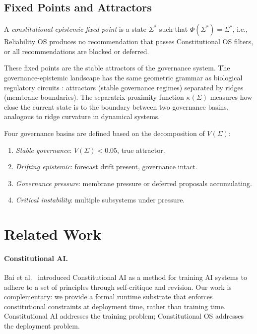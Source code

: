 \documentclass[11pt]{article}
\begin{document}
\subsection{Fixed Points and Attractors}

A \emph{constitutional-epistemic fixed point} is a state
$\Sigma^*$ such that $\Phi(\Sigma^*) = \Sigma^*$, i.e.,
Reliability OS produces no recommendation that passes
Constitutional OS filters, or all recommendations are blocked
or deferred.

These fixed points are the stable attractors of the governance
system. The governance-epistemic landscape has the same geometric
grammar as biological regulatory circuits
\citep{ferrell2002bistability}: attractors (stable governance
regimes) separated by ridges (membrane boundaries). The
separatrix proximity function $\kappa(\Sigma)$ measures how
close the current state is to the boundary between two governance
basins, analogous to ridge curvature in dynamical systems.

Four governance basins are defined based on the decomposition
of $V(\Sigma)$:
\begin{enumerate}
  \item \emph{Stable governance}: $V(\Sigma) < 0.05$, true attractor.
  \item \emph{Drifting epistemic}: forecast drift present,
    governance intact.
  \item \emph{Governance pressure}: membrane pressure or deferred
    proposals accumulating.
  \item \emph{Critical instability}: multiple subsystems under pressure.
\end{enumerate}

\section{Related Work}
\label{sec:related}

\paragraph{Constitutional AI.}
Bai et al.\ \citep{bai2022constitutional} introduced Constitutional
AI as a method for training AI systems to adhere to a set of
principles through self-critique and revision. Our work is
complementary: we provide a formal runtime substrate that enforces
constitutional constraints at deployment time, rather than training
time. Constitutional AI addresses the training problem; Constitutional
OS addresses the deployment problem.
\end{document}
